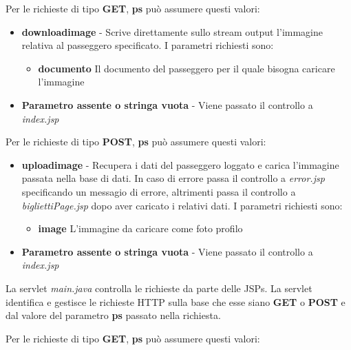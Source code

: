 \documentclass[a4paper,10pt]{article}
\begin{document}
Per le richieste di tipo \textbf{GET}, \textbf{ps} pu\`o assumere questi valori:
\begin{itemize}
 \item \textbf{downloadimage} - Scrive direttamente sullo stream output l'immagine relativa al passeggero specificato.
 			     I parametri richiesti sono:
			     \begin{itemize}
			      \item \textbf{documento} Il documento del passeggero per il quale bisogna caricare l'immagine
			     \end{itemize}
 \item \textbf{Parametro assente o stringa vuota} - Viene passato il controllo a \textit{index.jsp}
\end{itemize}
Per le richieste di tipo \textbf{POST}, \textbf{ps} pu\`o assumere questi valori:
\begin{itemize}
 \item \textbf{uploadimage} - Recupera i dati del passeggero loggato e carica l'immagine passata nella base di dati. In caso di errore passa il controllo a \textit{error.jsp} specificando un messagio
			     di errore, altrimenti passa il controllo a \textit{bigliettiPage.jsp} dopo aver caricato i relativi dati.
			     I parametri richiesti sono:
			     \begin{itemize}
			      \item \textbf{image} L'immagine da caricare come foto profilo
			     \end{itemize}

 \item \textbf{Parametro assente o stringa vuota} - Viene passato il controllo a \textit{index.jsp}
\end{itemize}


La servlet \textit{main.java} controlla le richieste da parte delle JSPs.
La servlet identifica e gestisce le richieste HTTP sulla base che esse siano \textbf{GET} o \textbf{POST} e dal valore del parametro \textbf{ps} passato nella richiesta.

Per le richieste di tipo \textbf{GET}, \textbf{ps} pu\`o assumere questi valori:
\end{document}
